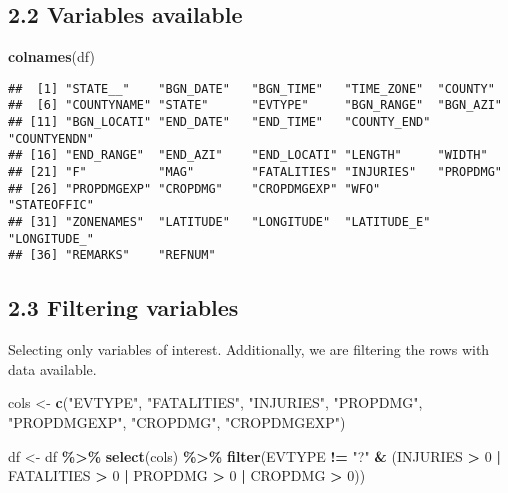\documentclass[
]{article}
\newenvironment{Shaded}{\begin{snugshade}}{\end{snugshade}}
\newcommand{\DecValTok}[1]{\textcolor[rgb]{0.00,0.00,0.81}{#1}}
\newcommand{\FunctionTok}[1]{\textcolor[rgb]{0.13,0.29,0.53}{\textbf{#1}}}
\newcommand{\NormalTok}[1]{#1}
\newcommand{\OtherTok}[1]{\textcolor[rgb]{0.56,0.35,0.01}{#1}}
\newcommand{\SpecialCharTok}[1]{\textcolor[rgb]{0.81,0.36,0.00}{\textbf{#1}}}
\newcommand{\StringTok}[1]{\textcolor[rgb]{0.31,0.60,0.02}{#1}}
\begin{document}
\hypertarget{variables-available}{%
\subsection{2.2 Variables available}\label{variables-available}}

\begin{Shaded}
\begin{Highlighting}[]
\FunctionTok{colnames}\NormalTok{(df)}
\end{Highlighting}
\end{Shaded}

\begin{verbatim}
##  [1] "STATE__"    "BGN_DATE"   "BGN_TIME"   "TIME_ZONE"  "COUNTY"    
##  [6] "COUNTYNAME" "STATE"      "EVTYPE"     "BGN_RANGE"  "BGN_AZI"   
## [11] "BGN_LOCATI" "END_DATE"   "END_TIME"   "COUNTY_END" "COUNTYENDN"
## [16] "END_RANGE"  "END_AZI"    "END_LOCATI" "LENGTH"     "WIDTH"     
## [21] "F"          "MAG"        "FATALITIES" "INJURIES"   "PROPDMG"   
## [26] "PROPDMGEXP" "CROPDMG"    "CROPDMGEXP" "WFO"        "STATEOFFIC"
## [31] "ZONENAMES"  "LATITUDE"   "LONGITUDE"  "LATITUDE_E" "LONGITUDE_"
## [36] "REMARKS"    "REFNUM"
\end{verbatim}

\hypertarget{filtering-variables}{%
\subsection{2.3 Filtering variables}\label{filtering-variables}}

Selecting only variables of interest. Additionally, we are filtering the
rows with data available.

\begin{Shaded}
\begin{Highlighting}[]
\NormalTok{cols }\OtherTok{\textless{}{-}} \FunctionTok{c}\NormalTok{(}\StringTok{"EVTYPE"}\NormalTok{, }\StringTok{"FATALITIES"}\NormalTok{, }\StringTok{"INJURIES"}\NormalTok{, }\StringTok{"PROPDMG"}\NormalTok{, }\StringTok{"PROPDMGEXP"}\NormalTok{, }
          \StringTok{"CROPDMG"}\NormalTok{, }\StringTok{"CROPDMGEXP"}\NormalTok{)}

\NormalTok{df }\OtherTok{\textless{}{-}}\NormalTok{ df }\SpecialCharTok{\%\textgreater{}\%} 
    \FunctionTok{select}\NormalTok{(cols) }\SpecialCharTok{\%\textgreater{}\%}
    \FunctionTok{filter}\NormalTok{(EVTYPE }\SpecialCharTok{!=} \StringTok{"?"} \SpecialCharTok{\&}\NormalTok{ (INJURIES }\SpecialCharTok{\textgreater{}} \DecValTok{0} \SpecialCharTok{|}\NormalTok{ FATALITIES }\SpecialCharTok{\textgreater{}} \DecValTok{0} \SpecialCharTok{|}\NormalTok{ PROPDMG }\SpecialCharTok{\textgreater{}} \DecValTok{0} \SpecialCharTok{|}\NormalTok{ CROPDMG }\SpecialCharTok{\textgreater{}} \DecValTok{0}\NormalTok{))}
\end{Highlighting}
\end{Shaded}
\end{document}
